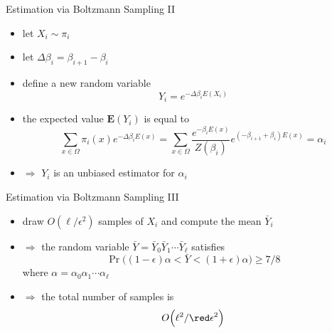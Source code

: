 \documentclass[slideColor]{prosper}
\newcommand{\E}{\mathbf{E}}
\renewcommand{\>}{\rangle}
\newcommand{\<}{\langle}
\begin{document}
\begin{slide}{Estimation via Boltzmann Sampling II}
\begin{itemize}
\item let $X_i \sim \pi_i$

\medskip
\item let $\Delta\beta_i = \beta_{i+1} - \beta_i$ 

\medskip
\item define a new random variable 
\[
Y_i = e^{-\Delta\beta_i E(X_i)}
\]
 
\item the expected value $\E(Y_i)$ is equal to
\[
\sum_{x \in \Omega}
\pi_i(x) 
e^{-\Delta\beta_i E(x)}  =
\sum_{x \in \Omega}
\frac{e^{-\beta_i E(x)}}{Z(\beta_i)} 
e^{(-\beta_{i+1} + \beta_i) E(x)}  
= 
\alpha_i
\]
\item $\Rightarrow$ $Y_i$ is an unbiased estimator for $\alpha_i$
\end{itemize}
\end{slide}


\begin{slide}{Estimation via Boltzmann Sampling III}
\begin{itemize}
\item draw $O(\ell/\epsilon^2)$ samples of $X_i$ and compute the mean $\bar{Y}_i$

\medskip
\item $\Rightarrow$ the random variable $\bar{Y}=\bar{Y}_0 \bar{Y}_1 \cdots \bar{Y}_{\ell}$ satisfies
\[
\Pr\Big(
(1-\epsilon) \alpha < \bar{Y} < (1+\epsilon) \alpha
\Big)
\ge 7/8
\]
where $\alpha=\alpha_0\alpha_1\cdots\alpha_\ell$

\medskip
\item $\Rightarrow$ the total number of samples is
\[
O\Big(\ell^2 / {\red \epsilon^2} \Big)
\] 
\end{itemize}
\end{slide}

\end{document}
